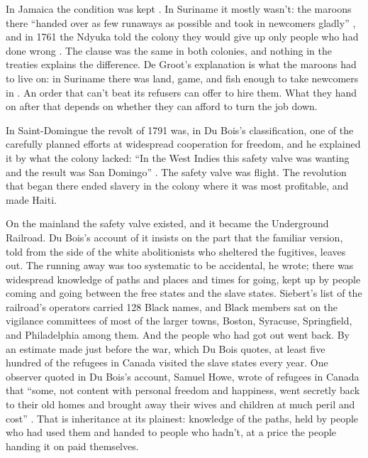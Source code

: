 In Jamaica the condition was kept \autocite[76]{degroot1984comparison}. In Suriname it mostly wasn't: the maroons there “handed over as few runaways as possible and took in newcomers gladly” \autocite[76]{degroot1984comparison}, and in 1761 the Ndyuka told the colony they would give up only people who had done wrong \autocite{vanderlinden2015okanisi}. The clause was the same in both colonies, and nothing in the treaties explains the difference. De Groot's explanation is what the maroons had to live on: in Suriname there was land, game, and fish enough to take newcomers in \autocite[76]{degroot1984comparison}. An order that can't beat its refusers can offer to hire them. What they hand on after that depends on whether they can afford to turn the job down.

In Saint-Domingue the revolt of 1791 was, in Du Bois's classification, one of the carefully planned efforts at widespread cooperation for freedom, and he explained it by what the colony lacked: “In the West Indies this safety valve was wanting and the result was San Domingo” \autocite[25]{dubois1907economic}. The safety valve was flight. The revolution that began there ended slavery in the colony where it was most profitable, and made Haiti.

On the mainland the safety valve existed, and it became the Underground Railroad. Du Bois's account of it insists on the part that the familiar version, told from the side of the white abolitionists who sheltered the fugitives, leaves out. The running away was too systematic to be accidental, he wrote; there was widespread knowledge of paths and places and times for going, kept up by people coming and going between the free states and the slave states. Siebert's list of the railroad's operators carried 128 Black names, and Black members sat on the vigilance committees of most of the larger towns, Boston, Syracuse, Springfield, and Philadelphia among them. And the people who had got out went back. By an estimate made just before the war, which Du Bois quotes, at least five hundred of the refugees in Canada visited the slave states every year. One observer quoted in Du Bois's account, Samuel Howe, wrote of refugees in Canada that “some, not content with personal freedom and happiness, went secretly back to their old homes and brought away their wives and children at much peril and cost” \autocite[26–28]{dubois1907economic}. That is inheritance at its plainest: knowledge of the paths, held by people who had used them and handed to people who hadn't, at a price the people handing it on paid themselves.


